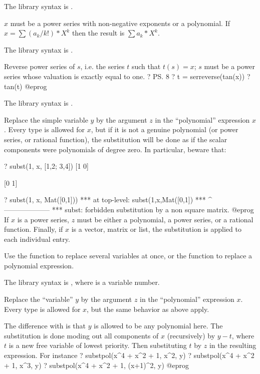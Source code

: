 The library syntax is .

\label{se:serlaplace}
$x$ must be a power series with non-negative
exponents or a polynomial. If $x=\sum (a_k/k!)*X^k$ then the result is $\sum
a_k*X^k$.

The library syntax is .

\label{se:serreverse}
Reverse power series of $s$, i.e. the series $t$ such that $t(s) = x$;
$s$ must be a power series whose valuation is exactly equal to one.
\bprog
? \ps 8
? t = serreverse(tan(x))
? tan(t)
@eprog

The library syntax is .

\label{se:subst}
Replace the simple variable $y$ by the argument $z$ in the ``polynomial''
expression $x$. Every type is allowed for $x$, but if it is not a genuine
polynomial (or power series, or rational function), the substitution will be
done as if the scalar components were polynomials of degree zero. In
particular, beware that:

\bprog
? subst(1, x, [1,2; 3,4])
[1 0]

[0 1]

? subst(1, x, Mat([0,1]))
  ***   at top-level: subst(1,x,Mat([0,1])
  ***                 ^--------------------
  *** subst: forbidden substitution by a non square matrix.
@eprog\noindent
If $x$ is a power series, $z$ must be either a polynomial, a power
series, or a rational function. Finally, if $x$ is a vector,
matrix or list, the substitution is applied to each individual entry.

Use the function  to replace several variables at once,
or the function  to replace a polynomial expression.

The library syntax is , where  is a variable number.

\label{se:substpol}
Replace the ``variable'' $y$ by the argument $z$ in the ``polynomial''
expression $x$. Every type is allowed for $x$, but the same behavior
as  above apply.

The difference with  is that $y$ is allowed to be any polynomial
here. The substitution is done moding out all components of $x$
(recursively) by $y - t$, where $t$ is a new free variable of lowest
priority. Then substituting $t$ by $z$ in the resulting expression. For
instance
\bprog
? substpol(x^4 + x^2 + 1, x^2, y)
? substpol(x^4 + x^2 + 1, x^3, y)
? substpol(x^4 + x^2 + 1, (x+1)^2, y)
@eprog

